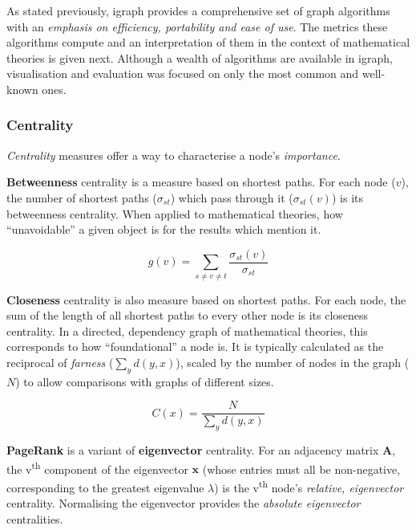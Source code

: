 As stated previously, igraph provides a comprehensive set of graph algorithms
with an \emph{emphasis on efficiency, portability and ease of use}.  The
metrics these algorithms compute and an interpretation of them in the context
of mathematical theories is given next.  Although a wealth of algorithms are
available in igraph, visualisation and evaluation was focused on only the most
common and well-known ones.

\subsubsection{Centrality}

\emph{Centrality} measures offer a way to characterise a node's
\emph{importance}.

\textbf{Betweenness} centrality is a measure based on shortest paths. For each
node ($v$), the number of shortest paths ($\sigma_{st}$) which pass through it
($\sigma_{st}\left(v\right)$) is its betweenness centrality. When applied to
mathematical theories, how ``unavoidable'' a given object is for the results
which mention it.~\cite{freeman1977}

\begin{equation}
  g\left(v\right) = \sum_{s \neq v \neq t} \frac{\sigma_{st}\left(v\right)}{\sigma_{st}}
\end{equation}

\textbf{Closeness} centrality is also measure based on shortest paths. For each
node, the sum of the length of all shortest paths to every other node is its
closeness centrality. In a directed, dependency graph of mathematical theories,
this corresponds to how ``foundational'' a node is. It is typically calculated
as the reciprocal of \emph{farness} ($\sum_{y}d\left(y,x\right)$), scaled by
the number of nodes in the graph ($N$) to allow comparisons with graphs of
different sizes.~\cite{bavelas1950}

\begin{equation}
  C\left(x\right) = \frac{N}{\sum_{y}d\left(y,x\right)}
\end{equation}

\textbf{PageRank} is a variant of \textbf{eigenvector} centrality.  For an
adjacency matrix $\mathbf{A}$, the v\textsuperscript{th} component of the
eigenvector $\mathbf{x}$ (whose entries must all be non-negative, corresponding
to the greatest eigenvalue $\lambda$) is the v\textsuperscript{th} node's
\emph{relative, eigenvector} centrality. Normalising the eigenvector provides
the \emph{absolute eigenvector} centralities.~\cite{newman2008}

